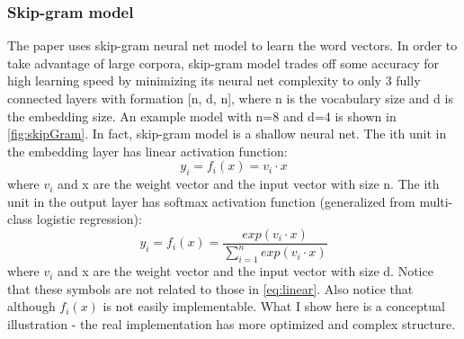 \documentclass{article}
\begin{document}
\subsubsection{Skip-gram model}
The paper uses skip-gram neural net model to learn the word vectors. In order to take advantage of large corpora, skip-gram model trades off some accuracy for high learning speed by minimizing its neural net complexity to only 3 fully connected layers with formation [n, d, n], where n is the vocabulary size and d is the embedding size. An example model with n=8 and d=4 is shown in \autoref{fig:skipGram}. In fact, skip-gram model is a shallow neural net. The ith unit in the embedding layer has linear activation function:
\begin{equation}
	y_i = f_i(x) = v_i \cdot x
	\label{eq:linear}
\end{equation}
where $ v_i $ and x are the weight vector and the input vector with size n. The ith unit in the output layer has softmax activation function (generalized from multi-class logistic regression):
\begin{equation}
	y_i = f_i(x) = \frac{exp(v_i \cdot x)}{\sum_{i = 1}^{n}exp(v_i \cdot x)}
\end{equation}
where $ v_i $ and x are the weight vector and the input vector with size d. Notice that these symbols are not related to those in \autoref{eq:linear}. Also notice that although $ f_i(x) $ is not easily implementable. What I show here is a conceptual illustration - the real implementation has more optimized and complex structure.
\end{document}
